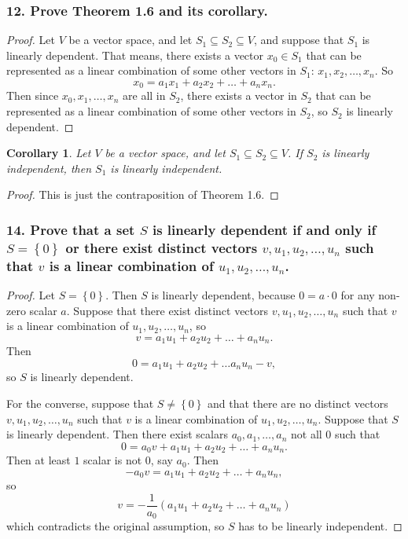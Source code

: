 \documentclass{article}
\newtheorem*{corollary}{Corollary}
\begin{document}
\subsubsection*{12. Prove Theorem 1.6 and its corollary.}
\begin{proof}
	Let $V$ be a vector space, and let $S_1 \subseteq S_2 \subseteq V$, and suppose that $S_1$ is linearly dependent. That means, there exists a vector $x_0 \in S_1$ that can be represented as a linear combination of some other vectors in $S_1$: $x_1, x_2, \dots, x_n$. So \[x_0 = a_1x_1 + a_2x_2 + \dots + a_nx_n.\] Then since $x_0, x_1, \dots, x_n$ are all in $S_2$, there exists a vector in $S_2$ that can be represented as a linear combination of some other vectors in $S_2$, so $S_2$ is linearly dependent.
\end{proof}
\begin{corollary}
	Let $V$ be a vector space, and let $S_1 \subseteq S_2 \subseteq V$. If $S_2$ is linearly independent, then $S_1$ is linearly independent.
\end{corollary}
\begin{proof}
	This is just the contraposition of Theorem 1.6.
\end{proof}

\subsubsection*{14. Prove that a set $S$ is linearly dependent if and only if $S = \left\{0\right\}$ or there exist distinct vectors $v, u_1, u_2, \dots, u_n$ such that $v$ is a linear combination of $u_1, u_2, \dots, u_n$.}
\begin{proof}
	Let $S = \left\{0\right\}$. Then $S$ is linearly dependent, because $0 = a \cdot 0$ for any non-zero scalar $a$. Suppose that there exist distinct vectors $v, u_1, u_2, \dots, u_n$ such that $v$ is a linear combination of $u_1, u_2, \dots, u_n$, so \[v = a_1u_1 + a_2u_2 + \dots + a_nu_n.\] Then \[0 = a_1u_1 + a_2u_2 + \dots a_nu_n - v,\] so $S$ is linearly dependent.

	For the converse, suppose that $S \ne \left\{0\right\}$ and that there are no distinct vectors $v, u_1, u_2, \dots, u_n$ such that $v$ is a linear combination of $u_1, u_2, \dots, u_n$. Suppose that $S$ is linearly dependent. Then there exist scalars $a_0, a_1, \dots, a_n$ not all $0$ such that \[0 = a_0v + a_1u_1 + a_2u_2 + \dots + a_nu_n.\] Then at least $1$ scalar is not $0$, say $a_0$. Then \[-a_0v = a_1u_1 + a_2u_2 + \dots + a_nu_n,\] so \[v = -\frac{1}{a_0}(a_1u_1 + a_2u_2 + \dots + a_nu_n)\] which contradicts the original assumption, so $S$ has to be linearly independent.
\end{proof}
\end{document}
